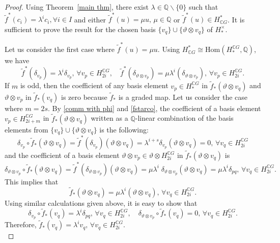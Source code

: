 \documentclass{amsart}
\newcommand{\thmref}[1]{Theorem~\ref{#1}}
\renewcommand{\hom}{\mathrm{Hom}}
\begin{document}
	\begin{proof}
		Using \thmref{main thm}, there exist $\lambda \in \mathbb{Q}\backslash \{0\}$ such that $\tilde{f}^*(c_i) = \lambda^i c_i, \forall i \in I$ and either $\tilde{f}^*(u) = \mu u,\, \mu \in \mathbb{Q}$ or $\tilde{f}^*(u)\in H^*_{\mathbb{C}G}$. It is sufficient to prove the result for the chosen basis $\{v_q\}\cup\{\vartheta\otimes v_q\}$ of $H_{*}^{\times}$. 
		
		Let us consider the first case where $\tilde{f}^*(u) = \mu u$. Using $H^*_{\mathbb{C}G}\cong \hom(H_*^{\mathbb{C}G},\mathbb{Q})$, we have \begin{equation}\label{fstarco}
			\tilde{f}^*(\delta_{v_p}) = \lambda^i \delta_{v_{p}}, \, \forall v_{p}\in H_{2i}^{\mathbb{C}G}, \quad \tilde{f}^*(\delta_{\vartheta\otimes v_{p}})  = \mu \lambda^i (\delta_{\vartheta \otimes v_{p}}), \, \forall v_{p}\in H_{2i}^{\mathbb{C}G}.
		\end{equation}
		If $m$ is odd, then the coefficient of any basis element $v_p \in H_*^{\mathbb{C}G}$ in $\tilde{f}_*(\vartheta \otimes v_q)$ and $\vartheta \otimes v_p$ in $\tilde{f}_*(v_q)$ is zero because $\tilde{f}_*$ is a graded map. Let us consider the case where $m=2s$.
		By \eqref{comm with phi} and \eqref{fstarco}, the coefficient of a basis element $v_p\in H_{2i+m}^{\mathbb{C}G}$ in $\tilde{f}_*(\vartheta \otimes v_q)$ written as a $\mathbb{Q}$-linear combination of the basis elements from $\{v_q\}\cup\{\vartheta\otimes v_q\}$ is the following:
		$$	 \delta_{v_p}\circ \tilde f_*(\vartheta\otimes v_q)
		=  \tilde f^* (\delta_{v_p}) (\vartheta\otimes v_q)
		=  \lambda^{i+s} \delta_{v_p}(\vartheta\otimes v_q)
		= 0,\, \forall v_q \in H_{2i}^{\mathbb{C}G}$$
		and the coefficient of a basis element $\vartheta \otimes v_p\in \vartheta \otimes H_{2i}^{\mathbb{C}G}$ in $\tilde{f}_*(\vartheta \otimes v_q)$ is
		$$ \delta_{\vartheta\otimes v_p}\circ \tilde f_*(\vartheta\otimes v_q)
		=  \tilde f^*(\delta_{\vartheta\otimes v_p})(\vartheta\otimes v_q)
		=  \mu \lambda^{i}\;\delta_{\vartheta \otimes v_p}(\vartheta\otimes v_q)= \mu\lambda^{i}\delta_{pq},\, \forall v_q \in H^{\mathbb{C}G}_{2i}.$$
		This implies that $$\tilde{f}_*(\vartheta \otimes v_q) = \mu \lambda^i (\vartheta \otimes v_q), \, \forall v_q \in H_{2i}^{\mathbb{C}G}.$$ 
		Using similar calculations given above, it is easy to show that $$\delta_{v_p}\circ \tilde{f}_*(v_q) = \lambda^i \delta_{pq},\, \forall v_q \in H_{2i}^{\mathbb{C}G},\quad \delta_{\vartheta \otimes v_p}\circ \tilde{f}_*(v_q)=0,\, \forall v_q\in H_{2i}^{\mathbb{C}G}.$$ Therefore, $\tilde{f}_*(v_q) = \lambda^i v_q,\, \forall v_q \in H_{2i}^{\mathbb{C}G}$.\\
		

\end{proof}
\end{document}
